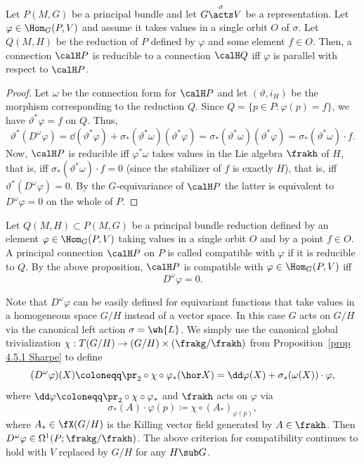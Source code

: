 \begin{prop}[{{\cite[Prop.~1.6.10]{RS2}}}]\label{prop 1.6.10 RS2}
    Let $P(M,G)$ be a principal bundle and let $G\overset{\sigma}{\acts}V$ be a representation. Let $\varphi\in\Hom_G(P,V)$ and assume it takes values in a single orbit $O$ of $\sigma$. Let $Q(M,H)$ be the reduction of $P$ defined by $\varphi$ and some element $f\in O$. Then, a connection $\calH P$ is reducible to a connection $\calH Q$ iff $\varphi$ is parallel with respect to $\calH P$.
\end{prop}
\begin{proof}
    Let $\omega$ be the connection form for $\calH P$ and let $(\vartheta,i_H)$ be the morphism corresponding to the reduction $Q$. Since $Q=\{p\in P:\varphi(p)=f\}$, we have $\vartheta^\ast \varphi=f$ on $Q$. Thus,
    \[\vartheta^\ast(D^\omega\varphi)=\dd (\vartheta^\ast \varphi)+\sigma_\ast(\vartheta^\ast\omega)(\vartheta^\ast\varphi)=\sigma_\ast(\vartheta^\ast\omega)(\vartheta^\ast\varphi)=\sigma_\ast(\vartheta^\ast\omega)\cdot f.\]
    Now, $\calH P$ is reducible iff $\varphi^\ast\omega$ takes values in the Lie algebra $\frakh$ of $H$, that is, iff $\sigma_\ast(\vartheta^\ast\omega)\cdot f=0$ (since the stabilizer of $f$ is exactly $H$), that is, iff $\vartheta^\ast(D^\omega\varphi)=0$. By the $G$-equivariance of $\calH P$ the latter is equivalent to $D^\omega \varphi=0$ on the whole of $P$.
\end{proof}


\begin{defn}\label{def compatible connection}
    Let $Q(M,H)\subset P(M,G)$ be a principal bundle reduction defined by an element $\varphi\in \Hom_G(P,V)$ taking values in a single orbit $O$ and by a point $f\in O$. A principal connection $\calH P$ on $P$ is called compatible with $\varphi$ if it is reducible to $Q$. By the above proposition, $\calH P$ is compatible with $\varphi\in\Hom_G(P,V)$ iff
    \[D^\omega\varphi=0.\]
\end{defn}

\begin{rem}\label{rem generalized covariant D}
    Note that $D^\omega \varphi$ can be easily defined for equivariant functions that take values in a homogeneous space $G\slash H$ instead of a vector space. In this case $G$ acts on $G\slash H$ via the canonical left action $\sigma=\wh{L}$. We simply use the canonical global trivialization $\chi:T(G\slash H)\to (G\slash H)\times(\frakg\slash\frakh)$ from Proposition~\ref{prop 4.5.1 Sharpe} to define
    \[(D^\omega{\varphi})(X)\coloneqq \pr_2\circ \chi\circ \varphi_\ast(\hor X)=\dd \varphi(X)+\sigma_\ast(\omega(X))\cdot {\varphi},\]
    where $\dd \varphi\coloneqq \pr_2\circ\chi\circ \varphi_\ast $ and $\frakh$ acts on $\varphi$ via 
    \[\sigma_\ast(A)\cdot \varphi(p)\coloneqq \chi\circ (A_{\ast})_{\varphi(p)},\]
    where $A_\ast\in\fX(G\slash H)$ is the Killing vector field generated by $A\in\frakh$. Then $D^\omega {\varphi}\in \Omega^1(P;\frakg\slash\frakh)$. The above criterion for compatibility continues to hold with $V$ replaced by $G\slash H$ for any $H\sub G$.
\end{rem}






